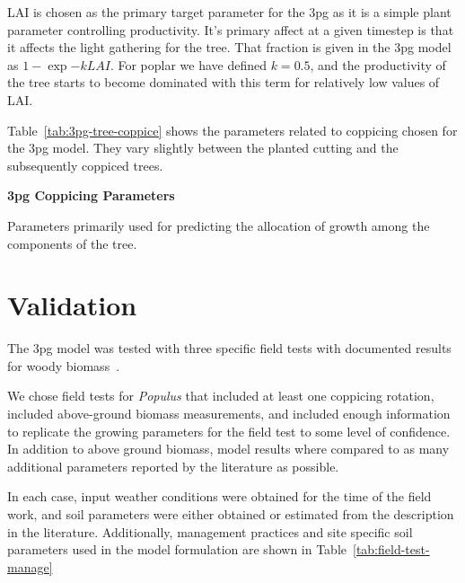 \documentclass[10pt]{article}
\newcommand{\pop}{\textit{Populus} }
\begin{document}
\ac{LAI} is chosen as the primary target parameter for the \ac{3pg} as
it is a simple plant parameter controlling productivity.  It's primary
affect at a given timestep is that it affects the light gathering for
the tree.  That fraction is given in the \ac{3pg} model as $1-\exp{-k
  LAI}$.  For poplar we have defined $k=0.5$, and the productivity of
the tree starts to become dominated with this term for relatively low
values of \ac{LAI}.

Table~\ref{tab:3pg-tree-coppice} shows the parameters related to coppicing
chosen for the \ac{3pg} model.  They vary slightly between the planted cutting
and the subsequently coppiced trees.

\begin{table}[!ht]
\caption{\textbf{\ac{3pg} Coppicing Parameters}}

\begin{flushleft}Parameters primarily used for predicting the allocation of growth among the components of the tree.
\end{flushleft}
\label{tab:3pg-tree-coppice}
 \end{table}

\section*{Validation}
\label{sec:validation}


The \ac{3pg} model was tested with three specific field tests with documented
results for woody biomass~\cite{Proe2002,Proe1999,Pontailler1999,Afas2008a}.  

We chose field tests for \pop that included at least one coppicing rotation,
included above-ground biomass measurements, and included enough information to
replicate the growing parameters for the field test to some level of confidence.
In addition to above ground biomass, model results where compared to as many
additional parameters reported by the literature as possible.

In each case, input weather conditions were obtained for the time of the field
work, and soil parameters were either obtained or estimated from the description
in the literature.  Additionally, management practices and site specific soil
parameters used in the model formulation are shown in
Table~\ref{tab:field-test-manage}
\end{document}
